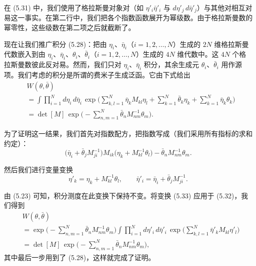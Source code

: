 在 (5.31) 中，我们使用了格拉斯曼对象对（如 $\eta'_i\bar{\eta}'_i$ 与 $d\eta'_j\,d\bar{\eta}'_j$）与其他对相互对易这一事实。在第二行中，我们把各个指数函数展开为幂级数。由于格拉斯曼数的幂零性，这些级数在第二项之后就截断了。

现在让我们推广积分 (5.28)：把由 $\eta_i$、$\bar{\eta}_i$（$i = 1, 2, \ldots, N$）生成的 $2N$ 维格拉斯曼代数嵌入到由 $\eta_i$、$\bar{\eta}_i$、$\theta_i$、$\bar{\theta}_i$（$i = 1, 2, \ldots, N$）生成的 $4N$ 维代数中。这 $4N$ 个格拉斯曼数彼此反对易。然而，我们只对 $\eta_i$、$\bar{\eta}_i$ 积分，其余生成元 $\theta_i$、$\bar{\theta}_i$ 用作源项。我们考虑的积分是所谓的费米子生成泛函。它由下式给出
\begin{equation}
  \begin{aligned}
    &W(\theta,\bar{\theta})\\
    &= \int\prod_{i=1}^{N}d\eta_i\,d\bar{\eta}_i\,
      \exp\Big(\sum_{k,l=1}^{N}\bar{\eta}_k M_{kl}\eta_l
      + \sum_{k=1}^{N}\bar{\theta}_k\eta_k
      + \sum_{k=1}^{N}\bar{\eta}_k\theta_k\Big)\\
    &= \det[M]\,\exp\Big(-\sum_{n,m=1}^{N}\bar{\theta}_n M^{-1}_{nm}\theta_m\Big) .
  \end{aligned}
\end{equation}

为了证明这一结果，我们首先对指数配方，把指数写成（我们采用所有指标的求和约定）：
\begin{equation}
  \big(\bar{\eta}_i + \bar{\theta}_j M^{-1}_{ji}\big) M_{ik}
  \big(\eta_k + M^{-1}_{kl}\theta_l\big)
  - \bar{\theta}_n M^{-1}_{nm}\theta_m .
\end{equation}

然后我们进行变量变换
\begin{equation}
  \eta'_k = \eta_k + M^{-1}_{kl}\theta_l, \qquad
  \bar{\eta}'_i = \bar{\eta}_i + \bar{\theta}_j M^{-1}_{ji} .
\end{equation}

由 (5.23) 可知，积分测度在此变换下保持不变。将变换 (5.33) 应用于 (5.32)，我们得到
\begin{equation}
  \begin{aligned}
    &W(\theta,\bar{\theta})\\
    &= \exp\Big(-\sum_{n,m=1}^{N}\bar{\theta}_n M^{-1}_{nm}\theta_m\Big)
      \int\prod_{i=1}^{N}d\eta'_i\,d\bar{\eta}'_i\,
      \exp\Big(\sum_{k,l=1}^{N}\bar{\eta}'_k M_{kl}\eta'_l\Big)\\
    &= \det[M]\,\exp\Big(-\sum_{n,m=1}^{N}\bar{\theta}_n M^{-1}_{nm}\theta_m\Big) ,
  \end{aligned}
\end{equation}
其中最后一步用到了 (5.28)，这样就完成了证明。

